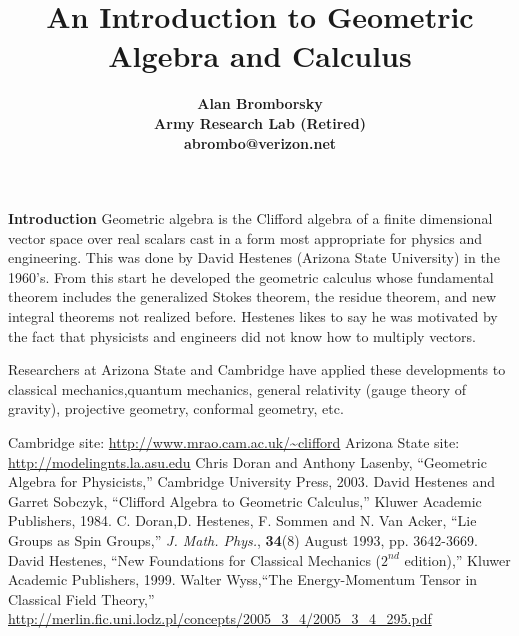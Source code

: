 \documentclass[12pt]{book}
\title{\bf\Large An Introduction to Geometric Algebra and Calculus}
\author{\bf Alan Bromborsky\\
\bf Army Research Lab (Retired)\\
\bf abrombo@verizon.net}
\begin{document}
\parskip 10pt

\maketitle
{\bf Introduction}\newline
Geometric algebra is the Clifford algebra of a finite dimensional
vector space over real scalars cast in a form most appropriate for
physics and engineering. This was done by David Hestenes (Arizona
State University) in the 1960's. From this start he developed the
geometric calculus whose fundamental theorem includes the generalized
Stokes theorem, the residue theorem, and new integral theorems
not realized before. Hestenes likes to say he was motivated by the
fact that physicists and engineers did not know how to multiply
vectors.

Researchers at Arizona State and Cambridge have applied these developments 
to classical mechanics,quantum mechanics, general relativity (gauge theory 
of gravity), projective geometry, conformal geometry, etc. 

\tableofcontents














\begin{thebibliography}{99}
 Cambridge site: \url{http://www.mrao.cam.ac.uk/~clifford}
 Arizona State site: \url{http://modelingnts.la.asu.edu}
 Chris Doran and Anthony Lasenby, ``Geometric Algebra for Physicists,'' Cambridge University
Press, 2003.
 David Hestenes and Garret Sobczyk, ``Clifford Algebra to Geometric Calculus,'' Kluwer Academic
Publishers, 1984.
 C. Doran,D. Hestenes, F. Sommen and N. Van Acker, ``Lie Groups as Spin Groups,'' 
	\emph{J. Math. Phys.},\textbf{ 34}(8) August 1993, pp. 3642-3669.
 David Hestenes, ``New Foundations for Classical Mechanics ($2^{nd}$ edition),'' Kluwer Academic
Publishers, 1999.
 Walter Wyss,``The Energy-Momentum Tensor in Classical Field Theory,'' \url{http://merlin.fic.uni.lodz.pl/concepts/2005_3_4/2005_3_4_295.pdf}
\end{thebibliography}
\end{document}

